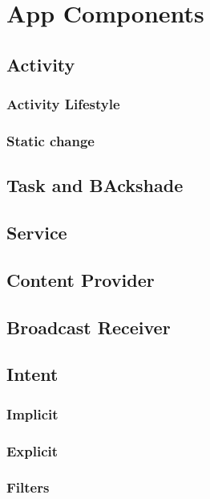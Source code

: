 \documentclass{article}
\begin{document}
\section{App Components}
\subsection{Activity}
\subsubsection{Activity Lifestyle}
\subsubsection{Static change}
\subsection{Task and BAckshade}
\subsection{Service}
\subsection{Content Provider}
\subsection{Broadcast Receiver}
\subsection{Intent}
\subsubsection{Implicit}
\subsubsection{Explicit}
\subsubsection{Filters}
\end{document}

